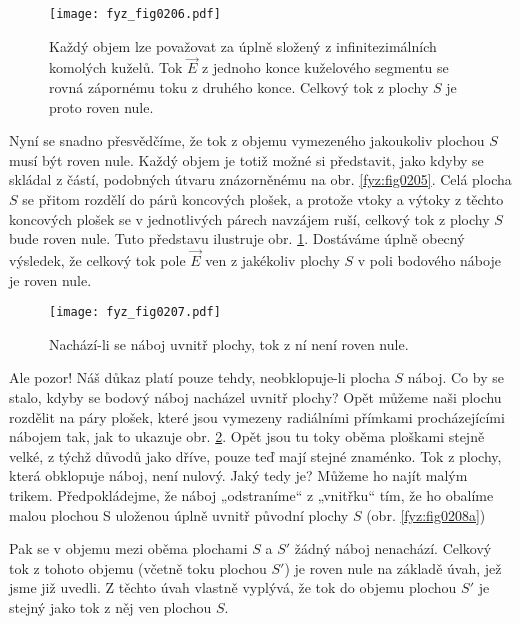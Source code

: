     \begin{figure}[ht!]
      \centering
      \texttt{[image: fyz\_fig0206.pdf]}
      \caption{Každý objem lze považovat za úplně složený z infinitezimálních komolých kuželů. Tok 
               \(\vec{E}\) z jednoho konce kuželového segmentu se rovná zápornému toku z druhého 
               konce. Celkový tok z plochy \(S\) je proto roven nule.}
      \label{fyz:fig0206} 
    \end{figure}

    Nyní se snadno přesvědčíme, že tok z objemu vymezeného jakoukoliv plochou \(S\) musí být roven 
    nule. Každý objem je totiž možné si představit, jako kdyby se skládal z částí, podobných útvaru 
    znázorněnému na obr. \ref{fyz:fig0205}. Celá plocha \(S\) se přitom rozdělí do párů 
    koncových plošek, a protože vtoky a výtoky z těchto koncových plošek se v jednotlivých párech 
    navzájem ruší, celkový tok z plochy \(S\) bude roven nule. Tuto představu ilustruje obr. 
    \ref{fyz:fig0206}. Dostáváme úplně obecný výsledek, že celkový tok pole \(\vec{E}\) ven 
    z jakékoliv plochy \(S\) v poli bodového náboje je roven nule. 

    \begin{figure}[ht!]
      \centering                  
      \texttt{[image: fyz\_fig0207.pdf]}
      \caption{Nachází-li se náboj uvnitř plochy, tok z ní není roven nule.}
      \label{fyz:fig0207}  
    \end{figure} 
                  
    Ale pozor! Náš důkaz platí pouze tehdy, neobklopuje-li plocha \(S\) náboj. Co by se stalo, 
    kdyby se bodový náboj nacházel uvnitř plochy? Opět můžeme naši plochu rozdělit na páry plošek, 
    které jsou vymezeny radiálními přímkami procházejícími nábojem tak, jak to ukazuje obr. 
    \ref{fyz:fig0207}. Opět jsou tu toky  oběma ploškami stejně velké, z týchž důvodů jako dříve, 
    pouze teď mají stejné znaménko. Tok z plochy, která obklopuje náboj, není nulový. Jaký tedy je? 
    Můžeme ho najít malým trikem. Předpokládejme, že náboj „odstraníme“ z „vnitřku“ tím, že ho 
    obalíme malou plochou S uloženou úplně uvnitř původní plochy \(S\) (obr. \ref{fyz:fig0208a})
   
    Pak se v objemu mezi oběma plochami \(S\) a \(S'\) žádný náboj nenachází. Celkový tok z tohoto 
    objemu (včetně toku plochou \(S'\)) je roven nule na základě úvah, jež jsme již uvedli. Z 
    těchto úvah vlastně vyplývá, že tok do objemu plochou \(S'\) je stejný jako tok z něj ven 
    plochou \(S\).

